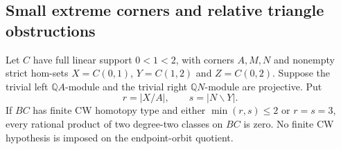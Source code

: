 \subsection{Small extreme corners and relative triangle obstructions}

\begin{lemma}
\label{CP2:A-relative-small-band-endpoint-orbits}
Let $C$ have full linear support $0<1<2$, with corners $A,M,N$
and nonempty strict hom-sets $X=C(0,1)$, $Y=C(1,2)$ and
$Z=C(0,2)$. Suppose the trivial left $\mathbb QA$-module and
the trivial right $\mathbb QN$-module are projective. Put
\[
 r=|X/A|,\qquad s=|N\backslash Y|.
\]
If $BC$ has finite CW homotopy type and either
$\min(r,s)\le2$ or $r=s=3$, every rational product of two
degree-two classes on $BC$ is zero. No finite CW hypothesis
is imposed on the endpoint-orbit quotient.
\end{lemma}

